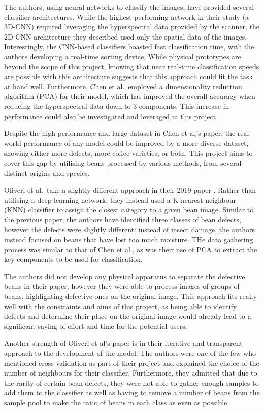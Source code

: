 The authors, using neural networks to classify the images, have provided several classifier architectures.
While the highest-performing network in their study (a 3D-CNN) required leveraging the hyperspectral data provided by the scanner,
the 2D-CNN architecture they described used only the spatial data of the images.
Interestingly, the CNN-based classifiers boasted fast classification time, with the authors developing a real-time sorting device.
While physical prototypes are beyond the scope of this project, knowing that near real-time classification speeds are
possible with this architecture suggests that this approach could fit the task at hand well.
Furthermore, Chen et al.\ employed a dimensionality reduction algorithm (PCA) for their model, which has improved the overall accuracy
when reducing the hyperspectral data down to 3 components.
This increase in performance could also be investigated and leveraged in this project.

Despite the high performance and large dataset in Chen et al.'s paper, the real-world performance of any model could
be improved by a more diverse dataset, showing either more defects, more coffee varieties, or both.
This project aims to cover this gap by utilising beans processed by various methods, from several distinct origins and species.

Oliveri et al.\  take a slightly different approach in their 2019 paper \cite{hyperspectralGreenOliveri}.
Rather than utilising a deep learning network, they instead used a K-nearest-neighbour (KNN) classifier to assign the closest
category to a given bean image.
Similar to the previous paper, the authors have identified three classes of bean defects, however the defects were slightly different:
instead of insect damage, the authors instead focused on beans that have lost too much moisture.
THe data gathering process was similar to that of Chen et al., as was their use of PCA to extract the key components
to be used for classification.

The authors did not develop any physical apparatus to separate the defective beans in their paper, however
they were able to process images of groups of beans, highlighting defective ones on the original image.
This approach fits really well with the constraints and aims of this project, as being able to identify defects and
determine their place on the original image would already lead to a significant saving of effort and time for the potential users.

Another strength of Oliveri et al's paper is in their iterative and transparent approach to the development of the model.
The authors were one of the few who mentioned cross validation as part of their project and explained the choice of the number
of neighbours for their classifier.
Furthermore, they admitted that due to the rarity of certain bean defects, they were not able to gather enough samples
to add them to the classifier as well as having to remove a number of beans from the sample pool to make the ratio of beans
in each class as even as possible.

